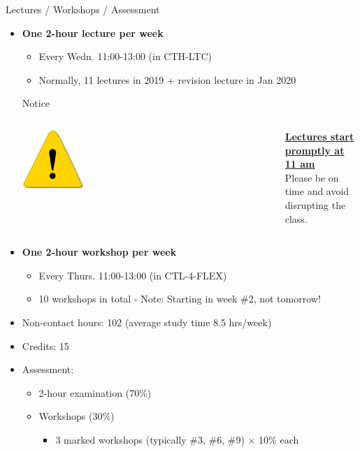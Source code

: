 \begin{frame}{Lectures / Workshops / Assessment}

\begin{itemize}
\item {\bf One 2-hour lecture per week}
   \begin{itemize}
       \item Every Wedn. 11:00-13:00 (in CTH-LTC)
       \item Normally, 11 lectures in 2019 + revision lecture in Jan 2020
    \end{itemize}

\vspace{0.1cm}
\begin{block001}{Notice}
\begin{columns}
  \begin{column}{0.20\textwidth}
   \begin{center}
     \includegraphics[width=0.25\textwidth]{./images/icons/warning.png}\\
   \end{center}
  \end{column}
  \begin{column}{0.80\textwidth}
  {\small
       {\bf \underline{Lectures start promptly at 11 am}}\\
       Please be on time and avoid disrupting the class.
   }
  \end{column}
\end{columns}
\end{block001}
\vspace{0.1cm}

\item {\bf One 2-hour workshop per week}
   \begin{itemize}
       \item Every Thurs. 11:00-13:00 (in CTL-4-FLEX)
       \item 10 workshops in total - {\color{red} Note: Starting in week \#2, not tomorrow!}
   \end{itemize}
\item Non-contact hours: 102 (average study time 8.5 hrs/week)
\item Credits: 15
\item Assessment:
   \begin{itemize}
      \item 2-hour examination (70\%)
      \item Workshops (30\%)
          \begin{itemize}
                \item 3 marked workshops (typically \#3, \#6, \#9) $\times$ 10\% each
          \end{itemize}
   \end{itemize}
\end{itemize}

\end{frame}


